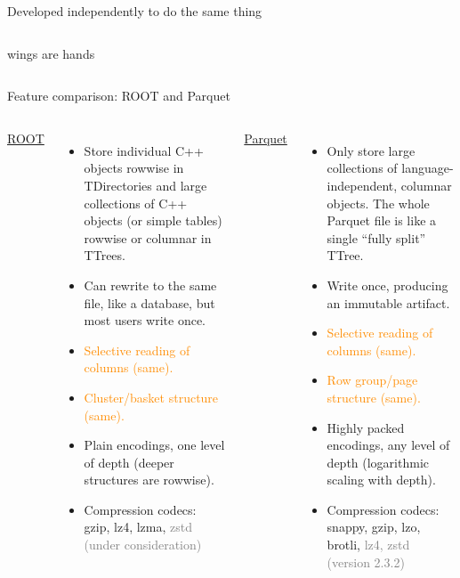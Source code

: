 \documentclass[aspectratio=169]{beamer}
\begin{document}
\begin{frame}{Developed independently to do the same thing}
\begin{columns}
\begin{center}
\vspace{0.25 cm}
wings are hands
\end{center}
\end{columns}
\end{frame}

\begin{frame}{Feature comparison: ROOT and Parquet}
\vspace{0.5 cm}
\begin{columns}[t]
{\large \underline{ROOT}}

\begin{itemize}
\item Store individual C++ objects rowwise in TDirectories and large collections of C++ objects (or simple tables) rowwise or columnar in TTrees.
\item Can rewrite to the same file, like a database, but most users write once.
\item \textcolor{darkorange}{Selective reading of columns (same).}
\item \textcolor{darkorange}{Cluster/basket structure (same).}
\item Plain encodings, one level of depth (deeper structures are rowwise).
\item Compression codecs: gzip, lz4, lzma, \textcolor{gray}{zstd (under consideration)}
\end{itemize}

{\large \underline{Parquet}}

\begin{itemize}
\item Only store large collections of language-independent, columnar objects. The whole Parquet file is like a single ``fully split'' TTree.
\item Write once, producing an immutable artifact.
\item \textcolor{darkorange}{Selective reading of columns (same).}
\item \textcolor{darkorange}{Row group/page structure (same).}
\item Highly packed encodings, any level of depth (logarithmic scaling with depth).
\item Compression codecs: snappy, gzip, lzo, brotli, \textcolor{gray}{lz4, zstd (version 2.3.2)}
\end{itemize}
\end{columns}
\end{frame}
\end{document}
